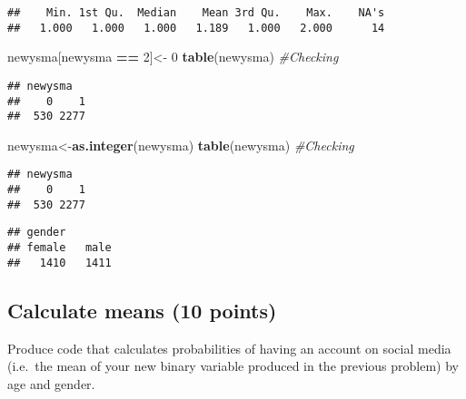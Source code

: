 \documentclass[
]{article}
\newenvironment{Shaded}{\begin{snugshade}}{\end{snugshade}}
\newcommand{\CommentTok}[1]{\textcolor[rgb]{0.56,0.35,0.01}{\textit{#1}}}
\newcommand{\DecValTok}[1]{\textcolor[rgb]{0.00,0.00,0.81}{#1}}
\newcommand{\KeywordTok}[1]{\textcolor[rgb]{0.13,0.29,0.53}{\textbf{#1}}}
\newcommand{\NormalTok}[1]{#1}
\newcommand{\OperatorTok}[1]{\textcolor[rgb]{0.81,0.36,0.00}{\textbf{#1}}}
\newcommand{\StringTok}[1]{\textcolor[rgb]{0.31,0.60,0.02}{#1}}
\begin{document}
\begin{verbatim}
##    Min. 1st Qu.  Median    Mean 3rd Qu.    Max.    NA's 
##   1.000   1.000   1.000   1.189   1.000   2.000      14
\end{verbatim}

\begin{Shaded}
\begin{Highlighting}[]
\NormalTok{newysma[newysma }\OperatorTok{==}\StringTok{ }\DecValTok{2}\NormalTok{]<-}\StringTok{ }\DecValTok{0}
\KeywordTok{table}\NormalTok{(newysma) }\CommentTok{#Checking}
\end{Highlighting}
\end{Shaded}

\begin{verbatim}
## newysma
##    0    1 
##  530 2277
\end{verbatim}

\begin{Shaded}
\begin{Highlighting}[]
\NormalTok{newysma<-}\KeywordTok{as.integer}\NormalTok{(newysma)}
\KeywordTok{table}\NormalTok{(newysma) }\CommentTok{#Checking}
\end{Highlighting}
\end{Shaded}

\begin{verbatim}
## newysma
##    0    1 
##  530 2277
\end{verbatim}

\begin{Shaded}
\end{Shaded}

\begin{verbatim}
## gender
## female   male 
##   1410   1411
\end{verbatim}

\hypertarget{calculate-means-10-points}{%
\subsection{Calculate means (10
points)}\label{calculate-means-10-points}}

Produce code that calculates probabilities of having an account on
social media (i.e.~the mean of your new binary variable produced in the
previous problem) by age and gender.
\end{document}
